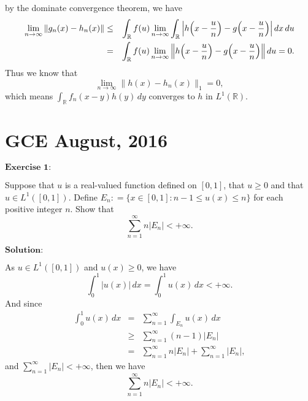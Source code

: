 \documentclass[12pt]{article}
\begin{document}
by the dominate convergence theorem, we have
\begin{eqnarray*}
    \lim_{n\to \infty} \|g_{n}(x) - h_{n}(x)\| & \leq & \int_{\mathbb{R}}^{} f (u) \lim_{n\to \infty}  \int_{\mathbb{R}}^{}  \Big{|} h \Big{(} x - \frac{u}{n} \Big{)} - g \Big{(} x - \frac{u}{n} \Big{)} \Big{|} \, d x \, d u \\ & = & \int_{\mathbb{R}}^{} f (u) \lim_{n\to \infty}  \Big{\|} h \Big{(} x - \frac{u}{n} \Big{)} - g \Big{(} x - \frac{u}{n} \Big{)} \Big{\|} \, d u = 0.
\end{eqnarray*}
Thus we know that
\begin{equation*}
    \lim_{n \to \infty} \|h(x) - h_{n}(x)\|_{1} = 0,
\end{equation*}
which means $\int_{\mathbb{R}}^{} f_{n} (x - y) h(y) \, d y$ converges to $h$ in $L^{1}(\mathbb{R})$.

\newpage

\section{GCE August, 2016}

$\textbf{Exercise 1:}$

Suppose that $u$ is a real-valued function defined on $[0, 1]$, that $u \geq 0$ and that $u \in L^{1}([0, 1])$. Define $E_{n} : = \{x \in [0, 1]: n - 1 \leq u(x) \leq n \}$ for each positive integer $n$. Show that
\begin{equation*}
    \sum_{n = 1}^{\infty} n |E_{n}| < + \infty.
\end{equation*}

\vspace{8pt}

$\textbf{Solution:}$

As $u \in L^{1}([0, 1])$ and $u(x) \geq 0$, we have
\begin{equation*}
    \int_{0}^{1} |u (x)| \, d x = \int_{0}^{1} u (x) \, d x < + \infty.
\end{equation*}
And since
\begin{eqnarray*}
\int_{0}^{1} u (x) \, d x  & = & \sum_{n = 1}^{\infty} \int_{E_{n}}^{} u(x) \, d x \\
& \geq & \sum_{n = 1}^{\infty} (n -1) |E_{n}| \\
& = & \sum_{n = 1}^{\infty} n |E_{n}| + \sum_{n = 1}^{\infty} |E_{n}|,
\end{eqnarray*}
and $\sum_{n = 1}^{\infty} |E_{n}| < + \infty$, then we have 
\begin{equation*}
    \sum_{n = 1}^{\infty} n |E_{n}| < + \infty.
\end{equation*}
\end{document}
